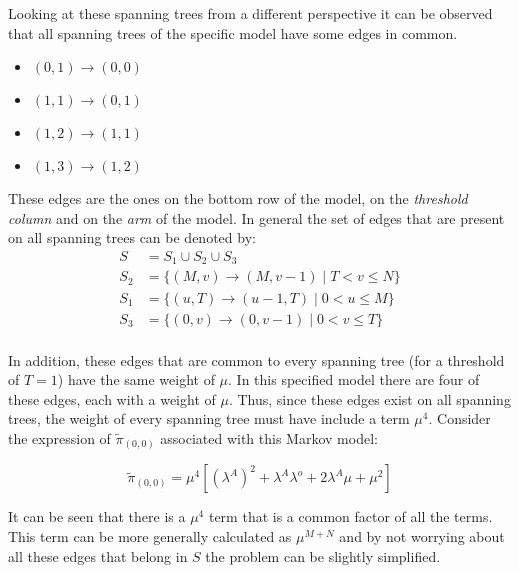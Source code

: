 Looking at these spanning trees from a different perspective it can be observed that all spanning trees of the specific model have some edges in common. 

\begin{multicols}{4}
    \begin{itemize}
        \item \((0,1) \rightarrow (0,0)\)
        \item \((1,1) \rightarrow (0,1)\)
        \item \((1,2) \rightarrow (1,1)\)
        \item \((1,3) \rightarrow (1,2)\)
    \end{itemize}
\end{multicols}

These edges are the ones on the bottom row of the model, on the \textit{threshold column} and on the \textit{arm} of the model. 
In general the set of edges that are present on all spanning trees can be denoted by:
\begin{align} \label{eq:common_edges_set}
    S &= S_1 \cup S_2 \cup S_3 \nonumber\\
    S_2 &= \{(M,v) \rightarrow (M,v-1) \; | \; T < v \leq N\} \nonumber \\
    S_1 &= \{(u,T) \rightarrow (u-1,T) \; | \; 0 < u \leq M\} \nonumber \\
    S_3 &= \{(0,v) \rightarrow (0,v-1) \; | \; 0 < v \leq T\} \nonumber \\
\end{align}

In addition, these edges that are common to every spanning tree (for a threshold of \(T=1\)) have the same weight of \(\mu\). 
In this specified model there are four of these edges, each with a weight of \(\mu\). 
Thus, since these edges exist on all spanning trees, the weight of every spanning tree must have include a term \(\mu^4\). 
Consider the expression of \(\tilde{\pi}_{(0,0)}\) associated with this Markov model:

\begin{equation}\label{eq:pi_00_rate_example}
    \tilde{\pi}_{(0,0)} = \mu^4[(\lambda^A)^2 + \lambda^A \lambda^o + 2\lambda^A \mu + \mu^2] 
\end{equation}

It can be seen that there is a \(\mu^4\) term that is a common factor of all the terms. 
This term can be more generally calculated as \(\mu^{M+N}\) and by not worrying about all these edges that belong in \(S\) the problem can be slightly simplified.


